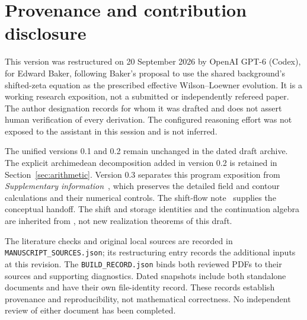 \section{Provenance and contribution disclosure}\label{app:provenance}

This version was restructured on 20 September 2026 by OpenAI GPT-6
(Codex), for Edward Baker, following Baker's proposal to use the
shared background's shifted-zeta equation as the prescribed
effective Wilson--Loewner evolution. It is a working research
exposition, not a submitted or independently refereed paper.
The author designation records for whom it was drafted and does
not assert human verification of every derivation. The configured
reasoning effort was not exposed to the assistant in this session
and is not inferred.

The unified versions 0.1 and 0.2 remain unchanged in the dated
draft archive. The explicit archimedean decomposition added in
version 0.2 is retained in Section~\ref{sec:arithmetic}.
Version 0.3 separates this program exposition from
\emph{Supplementary information}~\cite{Supplement}, which preserves
the detailed field and contour calculations and their numerical
controls. The shift-flow note~\cite{ShiftFlowNote} supplies the
conceptual handoff. The shift and storage identities and the
continuation algebra are inherited from
\cite{SharedBackground,AdaptivePath,CumulativePath}, not new
realization theorems of this draft.

The literature checks and original local sources are recorded in
\nolinkurl{MANUSCRIPT_SOURCES.json}; its restructuring entry records
the additional inputs at this revision. The
\nolinkurl{BUILD_RECORD.json} binds both reviewed PDFs to their
sources and supporting diagnostics. Dated snapshots include both
standalone documents and have their own file-identity record.
These records establish provenance and reproducibility, not
mathematical correctness. No independent review of either document
has been completed.
